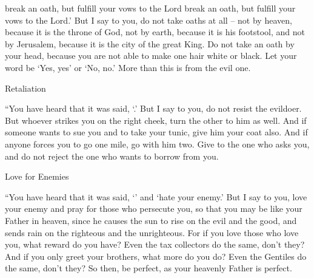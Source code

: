 {{{{{{}}}
break
an oath,
but
fulfill
your
vows to the Lord
break
an oath,
but
fulfill
your
vows to the Lord}}.’
But
I
say
to you,
do not
take oaths
at all
– not
by
heaven,
because
it is
the throne
of God,
not
by
earth,
because
it is
his
footstool,
and not
by
Jerusalem,
because
it is
the city
of the great
King.
Do not
take an oath
by
your
head,
because
you are
not
able
to make
one
hair
white
or
black.
Let your
word
be
‘Yes,
yes’
or ‘No,
no.’
More
than this
is
from
the evil one.
\par }{\SH Retaliation
\par }{\PP {}“You have heard
that
it was said, ‘{}.’
But
I
say
to you,
do not
resist
the evildoer.
But
whoever
strikes
you
on
the right
cheek,
turn
the other
to him as well.
And
if someone wants
to sue
you
and
to take
your
tunic,
give
him
your coat
also.
And
if
anyone forces
you
to go
one
mile,
go
with
him
two.
Give
to the one who asks
you,
and
do not
reject
the one who wants
to borrow
from
you.
\par }{\SH Love for Enemies
\par }{\PP {}“You have heard
that
it was said, ‘{}’
and
‘hate
your
enemy.’
But
I
say
to you,
love
your
enemy
and
pray
for
those
who persecute
you,
so that
you may be
like
your
Father
in
heaven,
since
he causes
the sun
to rise
on
the evil
and
the good,
and
sends rain
on
the righteous
and
the unrighteous.
For
if
you love
those
who love
you,
what
reward
do you have? Even
the tax collectors
do
the same, don’t they?
And
if
you
only
greet
your
brothers,
what
more
do you do? Even
the Gentiles
do
the same, don’t they?
So then,
be
perfect,
as
your
heavenly
Father
is
perfect.

\par }
